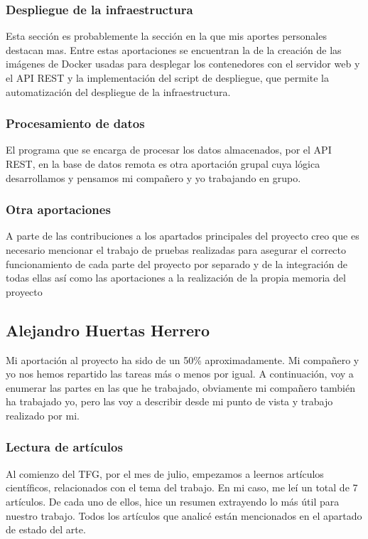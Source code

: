 \documentclass[11pt,spanish]{article}
\begin{document}
\subsubsection{Despliegue de la infraestructura}
Esta sección es probablemente la sección en la que mis aportes personales destacan mas. Entre estas aportaciones se encuentran la de la creación de las imágenes de Docker usadas para desplegar los contenedores con el servidor web y el API REST y la implementación del script de despliegue, que permite la automatización del despliegue de la infraestructura.

\subsubsection{Procesamiento de datos}
El programa que se encarga de procesar los datos almacenados, por el API REST, en la base de datos remota es otra aportación grupal cuya lógica desarrollamos y pensamos mi compañero y yo trabajando en grupo.

\subsubsection{Otra aportaciones}
A parte de las contribuciones a los apartados principales del proyecto creo que es necesario mencionar el trabajo de pruebas realizadas para asegurar el correcto funcionamiento de cada parte del proyecto por separado y de la integración de todas ellas así como las aportaciones a la realización de la propia memoria del proyecto

\subsection{Alejandro Huertas Herrero}
Mi aportación al proyecto ha sido de un 50\% aproximadamente. Mi compañero y yo nos hemos repartido las tareas más o menos por igual. A continuación, voy a enumerar las partes en las que he trabajado, obviamente mi compañero también ha trabajado yo, pero las voy a describir desde mi punto de vista y trabajo realizado por mi.

\subsubsection{Lectura de artículos }
Al comienzo del TFG, por el mes de julio, empezamos a leernos artículos científicos, relacionados con el tema del trabajo. En mi caso, me leí un total de 7 artículos. De cada uno de ellos, hice un resumen extrayendo lo más útil para nuestro trabajo. Todos los artículos que analicé están mencionados en el apartado de estado del arte.
\end{document}
